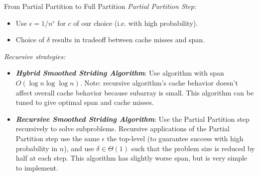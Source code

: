 \documentclass[x11names, svgnames, rgb]{beamer}
\DeclarePairedDelimiter{\paren}{(}{)}
\newcommand{\polylog}{\operatorname{polylog}}
\newcommand{\defn}[1]       {{\textit{\textbf{\boldmath #1}}}}
\begin{document}
\begin{frame}[t]{From Partial Partition to Full Partition}
	\emph{Partial Partition Step:}
	\begin{itemize}
		\item Use $\epsilon = 1/n^c$ for $c$ of our choice (i.e. with high probability).
		\item Choice of $\delta$ results in tradeoff between cache misses and span.
	\end{itemize}
	\emph{Recursive strategies:}
	\begin{itemize}
		\item \defn{Hybrid Smoothed Striding Algorithm}: Use algorithm with span $O(\log n \log \log n)$. Note: recursive algorithm's cache behavior doesn't affect overall cache behavior because subarray is small. This algorithm can be tuned to give optimal span and cache misses.
		\item \defn{Recursive Smoothed Striding Algorithm}: Use the Partial Partition step recursively to solve subproblems. Recursive applications of the Partial Partition step use the same $\epsilon$ the top-level (to guarantee success with high probability in $n$), and use $\delta \in \Theta(1)$ such that the problem size is reduced by half at each step. This algorithm has slightly worse span, but is very simple to implement.
	\end{itemize}
\end{frame}




\end{document}
